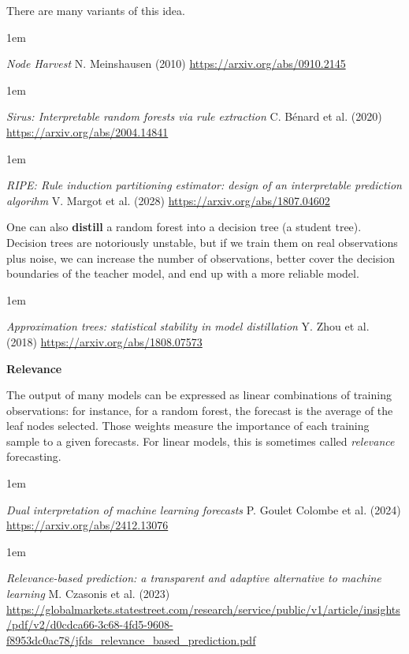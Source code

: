 \documentclass[a5paper]{article}
\let\d\textbf
\newenvironment{reference}{%
  \medskip\goodbreak
  \parskip 0pt
  \raggedright
  \leftskip 1em
  \obeylines
}{\par\medskip\goodbreak}
\def\subsection#1{{\par\bigskip\goodbreak\large\bfseries #1\par}}
\begin{document}
There are many variants of this idea.

\begin{reference}
  \emph{Node Harvest}
  N. Meinshausen (2010)
  \url{https://arxiv.org/abs/0910.2145}
\end{reference}

\begin{reference}
  \emph{Sirus: Interpretable random forests via rule extraction}
  C. B\'enard et al. (2020)
  \url{https://arxiv.org/abs/2004.14841}
\end{reference}

\begin{reference}
  \emph{RIPE: Rule induction partitioning estimator: design of an interpretable prediction algorihm}
  V. Margot et al. (2028)
  \url{https://arxiv.org/abs/1807.04602}
\end{reference}

One can also \d{distill} a random forest into a decision tree (a student tree).
Decision trees are notoriously unstable, but if we train them on
real observations plus noise, we can increase the number of observations,
better cover the decision boundaries of the teacher model,
and end up with a more reliable model.

\begin{reference}
  \emph{Approximation trees:  statistical stability in model distillation}
  Y. Zhou et al. (2018)
  \url{https://arxiv.org/abs/1808.07573}
\end{reference}

\subsection{Relevance}

The output of many models can be expressed as linear combinations of training observations:
for instance, for a random forest, the forecast is the average of the leaf nodes selected.
Those weights measure the importance of each training sample to a given forecasts.
For linear models, this is sometimes called \emph{relevance} forecasting.

\begin{reference}
  \emph{Dual interpretation  of machine learning forecasts}
  P. Goulet Colombe et al. (2024)
  \url{https://arxiv.org/abs/2412.13076}
\end{reference}

\begin{reference}
  \emph{Relevance-based prediction: a transparent and adaptive alternative to machine learning}
  M. Czasonis et al. (2023)
  \url{https://globalmarkets.statestreet.com/research/service/public/v1/article/insights/pdf/v2/d0cdca66-3c68-4fd5-9608-f8953dc0ac78/jfds_relevance_based_prediction.pdf}
\end{reference}
\end{document}
